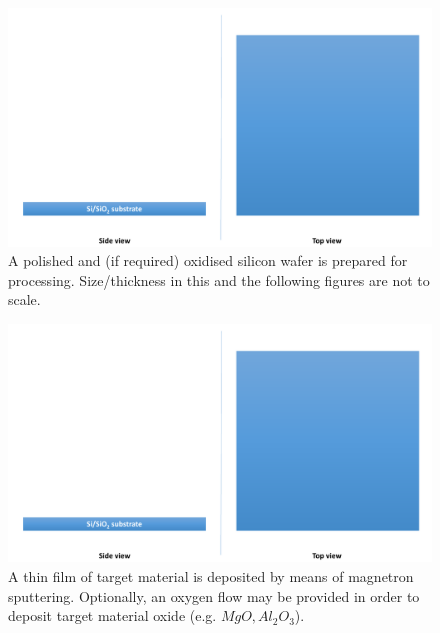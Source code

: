 \begin{multicols}{2}[]

	\begin{figure}[H]
        \centering
        \includegraphics[width=0.375\paperwidth, page=1]{img/04/Manufacturing_under.pdf}
        \caption{A polished and (if required) oxidised silicon wafer is prepared for processing. Size/thickness in this and the following figures are not to scale.}
        \label{FabricationSubstrate}
    \end{figure}
    
	\begin{figure}[H]
        \centering
        \includegraphics[width=0.375\paperwidth, page=2]{img/04/Manufacturing_under.pdf}
        \caption{A thin film of target material is deposited by means of magnetron sputtering. Optionally, an oxygen flow may be provided in order to deposit target material oxide (e.g. $MgO, Al_2O_3$).}
        \label{FabricationSputtering}
    \end{figure}
    
\end{multicols}
\vfill
